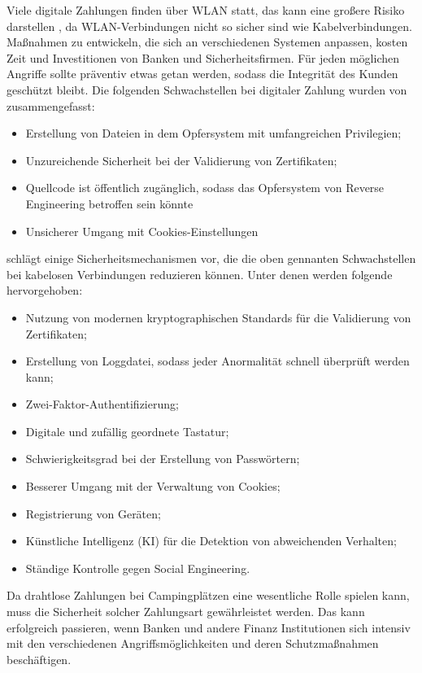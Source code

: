 Viele digitale Zahlungen finden über WLAN statt, das kann eine großere Risiko darstellen \cite{refip:NYRS}, 
da WLAN-Verbindungen nicht so sicher sind wie Kabelverbindungen. Maßnahmen zu entwickeln, die sich an 
verschiedenen Systemen anpassen, kosten Zeit und Investitionen von Banken und Sicherheitsfirmen. Für jeden 
möglichen Angriffe sollte präventiv etwas getan werden, sodass die Integrität des Kunden
geschützt bleibt. Die folgenden Schwachstellen bei digitaler Zahlung wurden von \cite{refip:NYRS} 
zusammengefasst:

\begin{itemize}
    \item Erstellung von Dateien in dem Opfersystem mit umfangreichen Privilegien;
    \item Unzureichende Sicherheit bei der Validierung von Zertifikaten;
    \item Quellcode ist öffentlich zugänglich, sodass das Opfersystem von Reverse Engineering betroffen sein könnte
    \item Unsicherer Umgang mit Cookies-Einstellungen
\end{itemize}

\cite{refip:NYRS} schlägt einige Sicherheitsmechanismen vor, die die oben gennanten Schwachstellen bei 
kabelosen Verbindungen reduzieren können. Unter denen werden folgende hervorgehoben: 

\begin{itemize}
    \item Nutzung von modernen kryptographischen Standards für die Validierung von Zertifikaten;
    \item Erstellung von Loggdatei, sodass jeder Anormalität schnell überprüft werden kann;
    \item Zwei-Faktor-Authentifizierung;
    \item Digitale und zufällig geordnete Tastatur;
    \item Schwierigkeitsgrad bei der Erstellung von Passwörtern;
    \item Besserer Umgang mit der Verwaltung von Cookies;
    \item Registrierung von Geräten;
    \item Künstliche Intelligenz (KI) für die Detektion von abweichenden Verhalten;
    \item Ständige Kontrolle gegen Social Engineering.
\end{itemize}

Da drahtlose Zahlungen bei Campingplätzen eine wesentliche Rolle spielen kann, muss die Sicherheit solcher
Zahlungsart gewährleistet werden. Das kann erfolgreich passieren, wenn Banken und andere Finanz
Institutionen sich intensiv mit den verschiedenen Angriffsmöglichkeiten und deren Schutzmaßnahmen beschäftigen.

